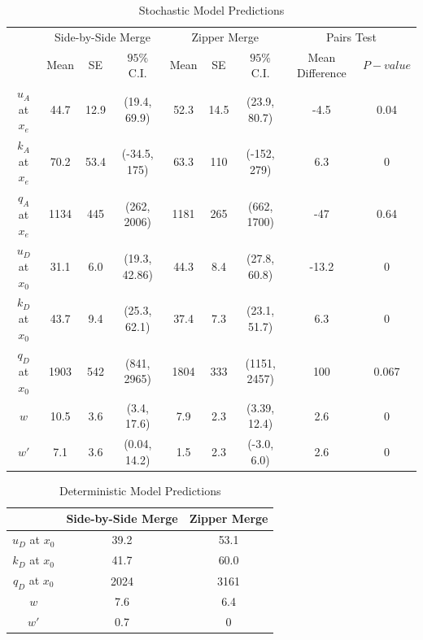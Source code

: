 \documentclass[Proceedings]{ascelike}
\begin{document}
\begin{table}
\caption{Stochastic Model Predictions}
\centering
\small
\begin{tabular}{|c|ccc|ccc|cc|}
 \hline
 \hline
&\multicolumn{3}{c|}{Side-by-Side Merge}&\multicolumn{3}{c|}{Zipper Merge}&\multicolumn{2}{c|}{Pairs Test}\\

 & Mean & SE & $95\%$ C.I. & Mean & SE & $95\%$ C.I. &  Mean Difference & $P-value$\\
\hline
$u_A$ at $x_e$ & 44.7& 12.9&(19.4,  69.9) & 52.3& 14.5& (23.9, 80.7) &-4.5 & 0.04\\
$k_A$ at $x_e$ & 70.2& 53.4& (-34.5,  175)& 63.3& 110 & (-152, 279)& 6.3 &0\\
$q_A$ at $x_e$ & 1134& 445& (262, 2006)& 1181& 265 & (662, 1700)& -47 & 0.64\\
\hline
$u_D$ at $x_0$ & 31.1& 6.0& (19.3, 42.86) & 44.3& 8.4&(27.8, 60.8)&-13.2 & 0\\
$k_D$ at $x_0$ & 43.7& 9.4& (25.3, 62.1)&37.4& 7.3 & (23.1, 51.7)&6.3 & 0\\
$q_D$ at $x_0$ & 1903& 542& (841, 2965)& 1804& 333 & (1151, 2457)&100 & 0.067\\
\hline
$w$     & 10.5 & 3.6 & (3.4, 17.6)& 7.9 & 2.3 & (3.39, 12.4)& 2.6 & 0 \\
$w'$     & 7.1 & 3.6 & (0.04, 14.2)& 1.5 & 2.3 & (-3.0, 6.0)& 2.6 & 0 \\
\hline
\hline
\end{tabular}
\label{tab:tab2}
\normalsize
\end{table}


\begin{table}
\caption{Deterministic Model Predictions}
\centering
\small
\begin{tabular}{|c|c|c|}
\hline
\hline
&Side-by-Side Merge&Zipper Merge\\
\hline
 $u_D$ at $x_0$  & 39.2 & 53.1 \\
 $k_D$ at $x_0$  & 41.7& 60.0 \\
 $q_D$ at $x_0$  & 2024&  3161 \\
 \hline
$w$     & 7.6 &   6.4 \\
$w'$     & 0.7 &  0  \\
 \hline
\hline
\end{tabular}
\label{tab:tab1}
\normalsize
\end{table}


\appendix\label{section:references}
%

%
\end{document}
